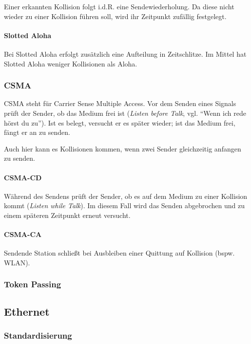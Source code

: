\documentclass[a4paper, 14pt]{article}
\begin{document}
	Einer erkannten Kollision folgt i.d.R. eine Sendewiederholung.
	Da diese nicht wieder zu einer Kollision führen soll, wird ihr Zeitpunkt zufällig festgelegt.

	\paragraph{Slotted Aloha}

	Bei Slotted Aloha erfolgt zusätzlich eine Aufteilung in Zeitschlitze.
	Im Mittel hat Slotted Aloha weniger Kollisionen als Aloha.

	\subsubsection{CSMA}

	CSMA steht für Carrier Sense Multiple Access.
	Vor dem Senden eines Signals prüft der Sender, ob das Medium frei ist (\emph{Listen before Talk}, vgl. \enquote{Wenn ich rede hörst du zu}).
	Ist es belegt, versucht er es später wieder; ist das Medium frei, fängt er an zu senden.

	Auch hier kann es Kollisionen kommen, wenn zwei Sender gleichzeitig anfangen zu senden.

	\paragraph{CSMA-CD}

	Während des Sendens prüft der Sender, ob es auf dem Medium zu einer Kollision kommt (\emph{Listen while Talk}).
	Im diesem Fall wird das Senden abgebrochen und zu einem späteren Zeitpunkt erneut versucht.

	\paragraph{CSMA-CA}

	Sendende Station schließt bei Ausbleiben einer Quittung auf Kollision (bspw. WLAN).

	\subsubsection{Token Passing}


	\subsection{Ethernet}

	\subsubsection{Standardisierung}
\end{document}
